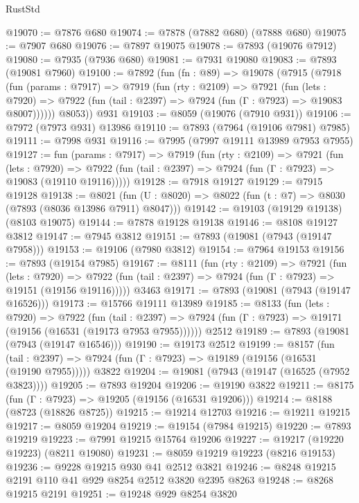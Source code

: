\begin{lexlean}{RustStd}
\begin{coremodule}
@19070 := @7876 @680
@19074 := @7878 (@7882 @680) (@7888 @680)
@19075 := @7907 @680
@19076 := @7897 @19075
@19078 := @7893 (@19076 @7912)
@19080 := @7935 (@7936 @680)
@19081 := @7931 @19080
@19083 := @7893 (@19081 @7960)
@19100 := @7892
    (fun (fn : @89) =>
    @19078
      (@7915
        (@7918
          (fun (params : @7917) =>
          @7919
            (fun (rty : @2109) =>
            @7921
              (fun (lets : @7920) =>
              @7922 (fun (tail : @2397) => @7924 (fun (Γ : @7923) => @19083 @8007))))))
        @8053))
    @931
@19103 := @8059 (@19076 (@7910 @931))
@19106 := @7972 (@7973 @931) @13986
@19110 := @7893 (@7964 (@19106 @7981) @7985)
@19111 := @7998 @931
@19116 := @7995 (@7997 @19111 @13989 @7953 @7955)
@19127 := fun (params : @7917) =>
  @7919
    (fun (rty : @2109) =>
    @7921
      (fun (lets : @7920) =>
      @7922 (fun (tail : @2397) => @7924 (fun (Γ : @7923) => @19083 (@19110 @19116)))))
@19128 := @7918 @19127
@19129 := @7915 @19128
@19138 := @8021
    (fun (U : @8020) => @8022 (fun (t : @7) => @8030 (@7893 (@8036 @13986 @7911) @8047)))
@19142 := @19103 (@19129 @19138) (@8103 @19075)
@19144 := @7878 @19128 @19138
@19146 := @8108 @19127 @3812
@19147 := @7945 @3812
@19151 := @7893 (@19081 (@7943 (@19147 @7958)))
@19153 := @19106 (@7980 @3812)
@19154 := @7964 @19153
@19156 := @7893 (@19154 @7985)
@19167 := @8111
    (fun (rty : @2109) =>
    @7921
      (fun (lets : @7920) =>
      @7922 (fun (tail : @2397) => @7924 (fun (Γ : @7923) => @19151 (@19156 @19116)))))
    @3463
@19171 := @7893 (@19081 (@7943 (@19147 @16526)))
@19173 := @15766 @19111 @13989
@19185 := @8133
    (fun (lets : @7920) =>
    @7922
      (fun (tail : @2397) =>
      @7924 (fun (Γ : @7923) => @19171 (@19156 (@16531 (@19173 @7953 @7955))))))
    @2512
@19189 := @7893 (@19081 (@7943 (@19147 @16546)))
@19190 := @19173 @2512
@19199 := @8157
    (fun (tail : @2397) => @7924 (fun (Γ : @7923) => @19189 (@19156 (@16531 (@19190 @7955)))))
    @3822
@19204 := @19081 (@7943 (@19147 (@16525 (@7952 @3823))))
@19205 := @7893 @19204
@19206 := @19190 @3822
@19211 := @8175 (fun (Γ : @7923) => @19205 (@19156 (@16531 @19206)))
@19214 := @8188 (@8723 (@18826 @8725))
@19215 := @19214 @12703
@19216 := @19211 @19215
@19217 := @8059 @19204
@19219 := @19154 (@7984 @19215)
@19220 := @7893 @19219
@19223 := @7991 @19215 @15764 @19206
@19227 := @19217 (@19220 @19223) (@8211 @19080)
@19231 := @8059 @19219 @19223 (@8216 @19153)
@19236 := @9228 @19215 @930 @41 @2512 @3821
@19246 := @8248 @19215 @2191 @110 @41 @929 @8254 @2512 @3820 @2395 @8263
@19248 := @8268 @19215 @2191
@19251 := @19248 @929 @8254 @3820

\end{coremodule}
\end{lexlean}
